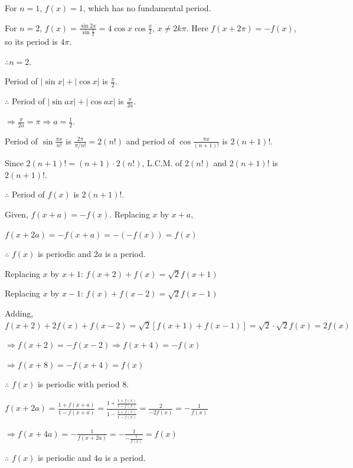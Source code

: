   For $n = 1$, $f(x) = 1$, which has no fundamental period.

  For $n = 2$, $f(x) = \frac{\sin2x}{\sin\frac{x}{2}} = 4\cos x\cos\frac{x}{2}$, $x\neq 2k\pi$. Here
  $f(x + 2\pi) = -f(x)$, so its period is $4\pi$.

  $\therefore n = 2$.

\item Period of $|\sin x| + |\cos x|$ is $\frac{\pi}{2}$.

  $\therefore$ Period of $|\sin ax| + |\cos ax|$ is $\frac{\pi}{2a}$.

  $\Rightarrow \frac{\pi}{2a} = \pi \Rightarrow a = \frac{1}{2}$.

\item Period of $\sin\frac{\pi x}{n!}$ is $\frac{2\pi}{\pi/n!} = 2(n!)$ and period of
  $\cos\frac{\pi x}{(n + 1)!}$ is $2(n + 1)!$.

  Since $2(n + 1)! = (n + 1)\cdot2(n!)$, L.C.M. of $2(n!)$ and $2(n + 1)!$ is $2(n + 1)!$.

  $\therefore$ Period of $f(x)$ is $2(n + 1)!$.

\item Given, $f(x + a) = -f(x)$. Replacing $x$ by $x + a$,

  $f(x + 2a) = -f(x + a) = -(-f(x)) = f(x)$

  $\therefore$ $f(x)$ is periodic and $2a$ is a period.

\item Replacing $x$ by $x + 1$: $f(x + 2) + f(x) = \sqrt{2}f(x + 1)$

  Replacing $x$ by $x - 1$: $f(x) + f(x - 2) = \sqrt{2}f(x - 1)$

  Adding, $f(x + 2) + 2f(x) + f(x - 2) = \sqrt{2}[f(x + 1) + f(x - 1)] = \sqrt{2}\cdot\sqrt{2}f(x) =
  2f(x)$

  $\Rightarrow f(x + 2) = -f(x - 2) \Rightarrow f(x + 4) = -f(x)$

  $\Rightarrow f(x + 8) = -f(x + 4) = f(x)$

  $\therefore$ $f(x)$ is periodic with period $8$.

\item $f(x + 2a) = \frac{1 + f(x + a)}{1 - f(x + a)} = \frac{1 + \frac{1 + f(x)}{1 - f(x)}}{1 -
  \frac{1 + f(x)}{1 - f(x)}} = \frac{2}{-2f(x)} = -\frac{1}{f(x)}$

  $\Rightarrow f(x + 4a) = -\frac{1}{f(x + 2a)} = -\frac{1}{-\frac{1}{f(x)}} = f(x)$

  $\therefore$ $f(x)$ is periodic and $4a$ is a period.

